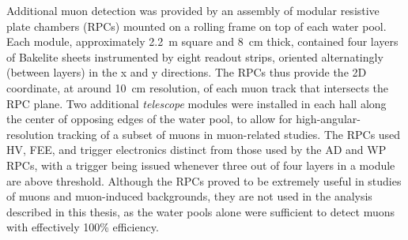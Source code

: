\documentclass[../thesis.tex]{subfiles}
\begin{document}
Additional muon detection was provided by an assembly of modular resistive plate
chambers (RPCs) mounted on a rolling frame on top of each water pool. Each
module, approximately 2.2~m square and 8~cm thick, contained four layers of
Bakelite sheets instrumented by eight readout strips, oriented alternatingly
(between layers) in the x and y directions. The RPCs thus provide the 2D
coordinate, at around 10~cm resolution, of each muon track that intersects the
RPC plane. Two additional \emph{telescope} modules were installed in each hall
along the center of opposing edges of the water pool, to allow for
high-angular-resolution tracking of a subset of muons in muon-related
studies. The RPCs used HV, FEE, and trigger electronics distinct from those used
by the AD and WP RPCs, with a trigger being issued whenever three out of four
layers in a module are above threshold. Although the RPCs proved to be extremely
useful in studies of muons and muon-induced backgrounds, they are not used in
the analysis described in this thesis, as the water pools alone were sufficient
to detect muons with effectively 100\% efficiency.

\subfilebackmatter
\end{document}

